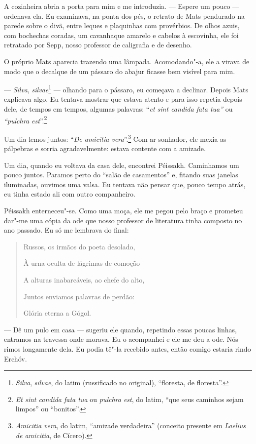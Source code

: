 A cozinheira abria a porta para mim e me introduzia. --- Espere um pouco
--- ordenava ela. Eu examinava, na ponta dos pés, o retrato de Mats
pendurado na parede sobre o divã, entre leques e plaquinhas com
provérbios. De olhos azuis, com bochechas coradas, um cavanhaque amarelo
e cabelos à escovinha, ele foi retratado por Sepp, nosso professor de
caligrafia e de desenho.

O próprio Mats aparecia trazendo uma lâmpada. Acomodando"-a, ele a virava
de modo que o decalque de um pássaro do abajur ficasse bem visível para
mim.

--- \emph{Silva}, \emph{silvae}\footnote{\emph{Silva}, \emph{silvae}, do
  latim (russificado no original), ``floresta, de floresta''.} ---
olhando para o pássaro, eu começava a declinar. Depois Mats explicava
algo. Eu tentava mostrar que estava atento e para isso repetia depois
dele, de tempos em tempos, algumas palavras: ``\emph{et sint candida
fata tua''} ou \emph{``pulchra est}''.\footnote{\emph{Et sint candida
  fata tua} ou \emph{pulchra est}, do latim, ``que seus caminhos sejam
  limpos'' ou ``bonitos''.}

Um dia lemos juntos: ``\emph{De amicitia vera}''.\footnote{\emph{Amicitia
  vera}, do latim, ``amizade verdadeira'' (conceito presente em
  \emph{Laelius de amicitia}, de Cícero).} Com ar sonhador, ele mexia as
pálpebras e sorria agradavelmente: estava contente com a amizade.

Um dia, quando eu voltava da casa dele, encontrei Péissakh. Caminhamos
um pouco juntos. Paramos perto do ``salão de casamentos'' e, fitando
suas janelas iluminadas, ouvimos uma valsa. Eu tentava não pensar que,
pouco tempo atrás, eu tinha estado ali com outro companheiro.

Péissakh enterneceu"-se. Como uma moça, ele me pegou pelo braço e
prometeu dar"-me uma cópia da ode que nosso professor de literatura tinha
composto no ano passado. Eu só me lembrava do final:

\begin{quotation}
Russos, os irmãos do poeta desolado,

À urna oculta de lágrimas de comoção

A alturas inabarcáveis, ao chefe do alto,

Juntos enviamos palavras de perdão:

Glória eterna a Gógol.
\end{quotation}

--- Dê um pulo em casa --- sugeriu ele quando, repetindo essas poucas
linhas, entramos na travessa onde morava. Eu o acompanhei e ele me deu a
ode. Nós rimos longamente dela. Eu podia tê"-la recebido antes, então
comigo estaria rindo Erchóv.

